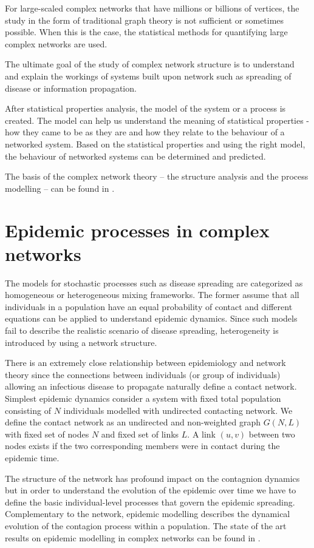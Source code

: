\documentclass[times, utf8, diplomski]{fer}
\begin{document}
For large-scaled complex networks that have millions or billions of vertices, the study in the form of traditional graph theory is not sufficient or sometimes possible. When this is the case, the statistical methods  for quantifying large complex networks are used. 

The ultimate goal of the study of complex network structure is to understand and explain the workings of systems built upon network such as spreading of disease or information propagation.

After statistical properties analysis, the model of the system or a process  is created. The model can help us understand the meaning of statistical properties - how they came to be as they are and how they relate to the behaviour of a networked system. Based on the statistical properties and using the right model, the behaviour of networked systems can be determined and predicted.

The basis of the complex network theory -- the structure  analysis and the process modelling -- can be found in \citet{Newman03thestructure}.

\section{Epidemic processes in complex networks}

The models for stochastic processes such as disease spreading are categorized as homogeneous or heterogeneous mixing frameworks. The former assume that all individuals in a population have an equal probability of contact and different equations can be applied to understand epidemic dynamics. Since such models fail to describe the realistic scenario of disease spreading,  heterogeneity is introduced by using a network structure.

There is an extremely close relationship between epidemiology and network theory since the connections between individuals (or group of individuals) allowing an infectious disease to propagate naturally define a contact network. Simplest epidemic dynamics consider a system with fixed total population consisting of $N$ individuals modelled with undirected contacting network. We define the contact network as an undirected and non-weighted graph $G(N, L)$ with fixed set of nodes $N$ and fixed set of links $L$. A link $(u, v)$ between two nodes exists if the two corresponding members were in contact during the epidemic time.

The structure of the network has profound impact on the contagnion dynamics but in order to understand the evolution of the epidemic over time we have to define the basic individual-level processes that govern the epidemic spreading. Complementary to the network, epidemic modelling describes the dynamical evolution of the contagion process within a population. The state of the art results on epidemic modelling in complex networks can be found in \citet{revmod}.
\end{document}
